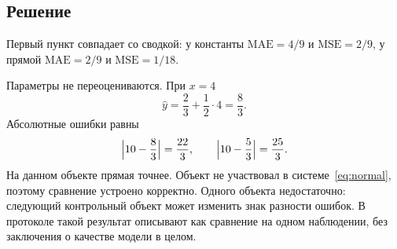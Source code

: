 \documentclass[11pt,a4paper]{article}
\begin{document}
\subsection{Решение}

Первый пункт совпадает со сводкой: у константы \(\mathrm{MAE}=4/9\) и \(\mathrm{MSE}=2/9\), у прямой \(\mathrm{MAE}=2/9\) и \(\mathrm{MSE}=1/18\).

Параметры не переоцениваются. При \(x=4\)
\[
\hat y=\frac23+\frac12\cdot 4=\frac83.
\]
Абсолютные ошибки равны
\[
\Bigl|10-\frac83\Bigr|=\frac{22}{3},
\qquad
\Bigl|10-\frac53\Bigr|=\frac{25}{3}.
\]
На данном объекте прямая точнее. Объект не участвовал в системе~\eqref{eq:normal}, поэтому сравнение устроено корректно. Одного объекта недостаточно: следующий контрольный объект может изменить знак разности ошибок. В протоколе такой результат описывают как сравнение на одном наблюдении, без заключения о качестве модели в целом.
\end{document}
